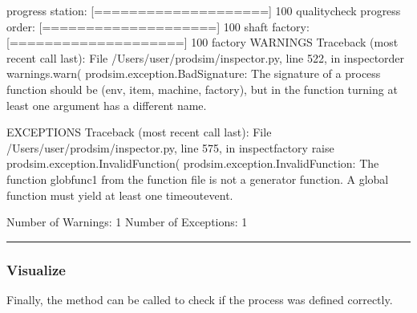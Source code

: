 \documentclass[letterpaper,10pt,english]{sphinxmanual}
\begin{document}
\begin{sphinxVerbatim}[commandchars=\\\{\}]
progress station: [====================] 100\PYGZpc{}  quality\PYGZus{}check
progress order:   [====================] 100\PYGZpc{}  shaft
factory:          [====================] 100\PYGZpc{}  factory
WARNINGS\PYGZhy{}\PYGZhy{}\PYGZhy{}\PYGZhy{}\PYGZhy{}\PYGZhy{}\PYGZhy{}\PYGZhy{}\PYGZhy{}\PYGZhy{}\PYGZhy{}\PYGZhy{}\PYGZhy{}\PYGZhy{}\PYGZhy{}\PYGZhy{}\PYGZhy{}\PYGZhy{}\PYGZhy{}
Traceback (most recent call last):
  File \PYGZdq{}/Users/user/prodsim/inspector.py\PYGZdq{}, line 522, in \PYGZus{}\PYGZus{}inspect\PYGZus{}order
    warnings.warn(
        prodsim.exception.BadSignature: The signature of a process function should be (env, item, machine,
        factory), but in the function \PYGZsq{}turning\PYGZsq{} at least one argument has a different name.

EXCEPTIONS\PYGZhy{}\PYGZhy{}\PYGZhy{}\PYGZhy{}\PYGZhy{}\PYGZhy{}\PYGZhy{}\PYGZhy{}\PYGZhy{}\PYGZhy{}\PYGZhy{}\PYGZhy{}\PYGZhy{}\PYGZhy{}\PYGZhy{}\PYGZhy{}\PYGZhy{}
Traceback (most recent call last):
  File \PYGZdq{}/Users/user/prodsim/inspector.py\PYGZdq{}, line 575, in \PYGZus{}\PYGZus{}inspect\PYGZus{}factory
    raise prodsim.exception.InvalidFunction(
        prodsim.exception.InvalidFunction: The function \PYGZsq{}glob\PYGZus{}func\PYGZus{}1\PYGZsq{} from the
        function file is not a generator function. A global function must yield at least one timeout\PYGZhy{}event.

\PYGZhy{}\PYGZhy{}\PYGZhy{}\PYGZhy{}\PYGZhy{}\PYGZhy{}\PYGZhy{}\PYGZhy{}\PYGZhy{}\PYGZhy{}\PYGZhy{}\PYGZhy{}\PYGZhy{}\PYGZhy{}\PYGZhy{}\PYGZhy{}\PYGZhy{}\PYGZhy{}\PYGZhy{}\PYGZhy{}\PYGZhy{}\PYGZhy{}\PYGZhy{}\PYGZhy{}\PYGZhy{}\PYGZhy{}\PYGZhy{}
Number of Warnings:    1
Number of Exceptions:  1
\PYGZhy{}\PYGZhy{}\PYGZhy{}\PYGZhy{}\PYGZhy{}\PYGZhy{}\PYGZhy{}\PYGZhy{}\PYGZhy{}\PYGZhy{}\PYGZhy{}\PYGZhy{}\PYGZhy{}\PYGZhy{}\PYGZhy{}\PYGZhy{}\PYGZhy{}\PYGZhy{}\PYGZhy{}\PYGZhy{}\PYGZhy{}\PYGZhy{}\PYGZhy{}\PYGZhy{}\PYGZhy{}\PYGZhy{}\PYGZhy{}
\end{sphinxVerbatim}


\bigskip\hrule\bigskip



\subsubsection{Visualize}
\label{\detokenize{source/Examples/example01:visualize}}\label{\detokenize{source/Examples/example01:id6}}
\sphinxAtStartPar
Finally, the  method can be called to check if the process was defined correctly.
\end{document}
